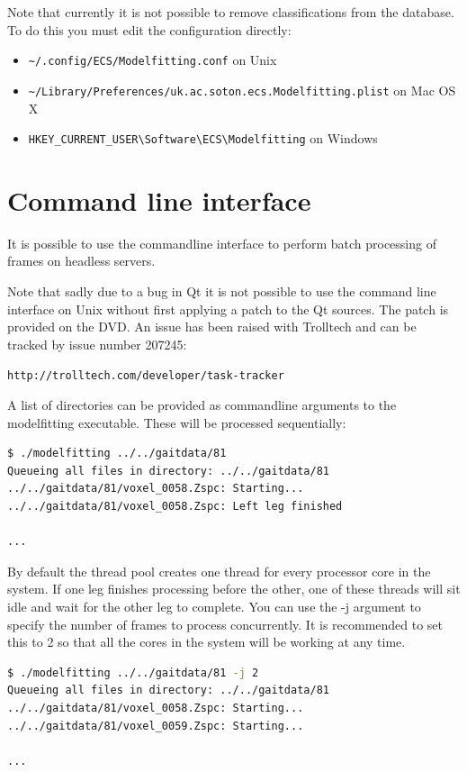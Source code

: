 Note that currently it is not possible to remove classifications from the database.
To do this you must edit the configuration directly:

\begin{itemize}
	\item \verb+~/.config/ECS/Modelfitting.conf+ on Unix
	\item \verb+~/Library/Preferences/uk.ac.soton.ecs.Modelfitting.plist+ on Mac OS X
	\item \verb+HKEY_CURRENT_USER\Software\ECS\Modelfitting+ on Windows
\end{itemize}


\clearpage
\section{Command line interface}
\label{manual:commandline}

It is possible to use the commandline interface to perform batch processing of frames on headless servers.

Note that sadly due to a bug in Qt it is not possible to use the command line interface on Unix without first applying a patch to the Qt sources.
The patch is provided on the DVD.
An issue has been raised with Trolltech and can be tracked by issue number 207245:

\verb+http://trolltech.com/developer/task-tracker+

\bigskip
\noindent A list of directories can be provided as commandline arguments to the modelfitting executable.
These will be processed sequentially:

\begin{lstlisting}[firstnumber=1,language=sh,frame=single]
$ ./modelfitting ../../gaitdata/81
Queueing all files in directory: ../../gaitdata/81
../../gaitdata/81/voxel_0058.Zspc: Starting...
../../gaitdata/81/voxel_0058.Zspc: Left leg finished

...
\end{lstlisting}

By default the thread pool creates one thread for every processor core in the system.
If one leg finishes processing before the other, one of these threads will sit idle and wait for the other leg to complete.
You can use the -j argument to specify the number of frames to process concurrently.
It is recommended to set this to 2 so that all the cores in the system will be working at any time.

\begin{lstlisting}[firstnumber=1,language=sh,frame=single]
$ ./modelfitting ../../gaitdata/81 -j 2
Queueing all files in directory: ../../gaitdata/81
../../gaitdata/81/voxel_0058.Zspc: Starting...
../../gaitdata/81/voxel_0059.Zspc: Starting...

...
\end{lstlisting}
